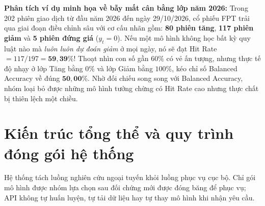 \documentclass[12pt,a4paper]{report}
\begin{document}
\textbf{Phân tích ví dụ minh họa về bẫy mất cân bằng lớp năm 2026:}
Trong 202 phiên giao dịch từ đầu năm 2026 đến ngày 29/10/2026, cổ phiếu FPT trải qua giai đoạn điều chỉnh sâu với cơ cấu nhãn gồm: \textbf{80 phiên tăng}, \textbf{117 phiên giảm} và \textbf{5 phiên đứng giá} ($y_t = 0$). Nếu một mô hình không học bất kỳ quy luật nào mà \textit{luôn luôn dự đoán giảm} ở mọi ngày, nó sẽ đạt Hit Rate $= 117 / 197 = \mathbf{59,39\%}$! Thoạt nhìn con số gần $60\%$ có vẻ ấn tượng, nhưng thực tế độ nhạy ở lớp Tăng bằng $0\%$ và lớp Giảm bằng $100\%$, kéo chỉ số Balanced Accuracy về đúng $\mathbf{50,00\%}$. Nhờ đối chiếu song song với Balanced Accuracy, nhóm loại bỏ được những mô hình tưởng chừng có Hit Rate cao nhưng thực chất bị thiên lệch một chiều.

\section{Kiến trúc tổng thể và quy trình đóng gói hệ thống}
Hệ thống tách luồng nghiên cứu ngoại tuyến khỏi luồng phục vụ cục bộ. Chỉ gói mô hình được nhóm lựa chọn sau đối chứng mới được đóng băng để phục vụ; API không tự huấn luyện, tự tải dữ liệu hay tự thay mô hình khi nhận yêu cầu.
\end{document}
